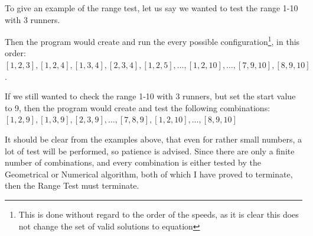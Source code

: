To give an example of the range test, let us say we wanted to test the range 1-10 with 3 runners.

Then the program would create and run the every possible configuration\footnote{This is done without regard to the order of the speeds, as it is clear this does not change the set of valid solutions to equation }, in this order:
$[1, 2, 3], [1, 2, 4], [1, 3, 4], [2, 3, 4], [1, 2, 5], \ldots, [1, 2, 10], \ldots, [7 ,9 ,10], [8, 9, 10]$.

If we still wanted to check the range 1-10 with 3 runners, but set the start value to 9, then the program would create and test the following combinations: 
$[1, 2, 9], [1, 3, 9], [2, 3, 9], \ldots, [7, 8, 9], [1, 2, 10], \ldots, [8, 9, 10]$

It should be clear from the examples above, that even for rather small numbers, a lot of test will be performed, so patience is advised. Since there are only a finite number of combinations, and every combination is either tested by the Geometrical or Numerical algorithm, both of which I have proved to terminate, then the Range Test must terminate.  
